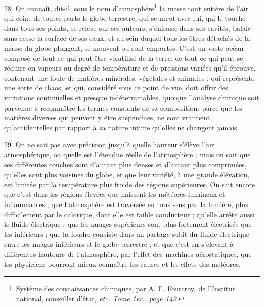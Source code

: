 \documentclass[a4paper, 11pt, oneside, polutonikogreek, french]{article}
\begin{document}
28. \og On connaît, dit-il, sous le nom d'atmosphère\footnote{Système des connaissances chimiques, par A. F. Fourcroy, de l'Institut national, conseiller d'état, \emph{etc.} \emph{Tome 1er., page 149.}} la masse tout entière de l'air qui ceint de toutes parts le globe terrestre, qui se meut avec lui, qui le touche dans tous ses points, se relève sur ses auteurs, s'enfonce dans ses cavités, balaie sans cesse la surface de ses eaux, et au sein duquel tous les êtres détachés de la masse du globe plongent, se meuvent ou sont emportés. C'est un vaste océan composé de tout ce qui peut être volatilisé de la terre, de tout ce qui peut se réduire en vapeurs au degré de température et de pressions variées qu'il éprouve, contenant une foule de matières minérales, végétales et animales ; qui représente une sorte de chaos, et qui, considéré sous ce point de vue, doit offrir des variations continuelles et presque indéterminables, quoique l'analyse chimique soit parvenue à reconnaître les termes constants de sa composition, parce que les matières diverses qui peuvent y être suspendues, ne sont vraiment qu'accidentelles par rapport à sa nature intime qu'elles ne changent jamais. \fg

29. \og On ne sait pas avec précision jusqu'à quelle hauteur s'élève l'air atmosphérique, ou quelle est l'étendue réelle de l'atmosphère ; mais on sait que ses différentes couches sont d'autant plus denses et d'autant plus comprimées, qu'elles sont plus voisines du globe, et que leur variété, à une grande élévation, est limitée par la température plus froide des régions supérieures. On sait encore que c'est dans les régions élevées que naissent les météores lumineux et inflammables ; que l'atmosphère est traversée en tous sens par la lumière, plus difficilement par le calorique, dont elle est faible conducteur ; qu'elle arrête aussi le fluide électrique ; que les nuages supérieurs sont plus fortement électrisés que les inférieurs ; que la foudre consiste dans un partage subit du fluide électrique entre les nuages inférieurs et le globe terrestre ; et que c'est en s'élevant à différentes hauteurs de l'atmosphère, par l'effet des machines aérostatiques, que les physiciens pourront mieux connaître les causes et les effets des météores. \fg
\end{document}
